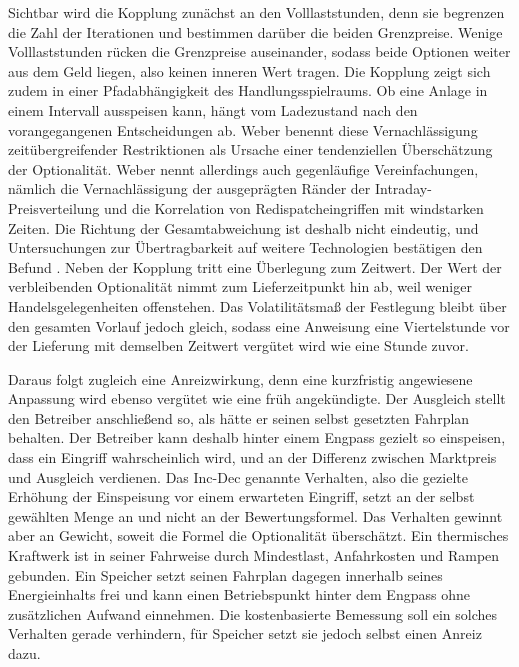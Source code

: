 Sichtbar wird die Kopplung zunächst an den Volllaststunden, denn sie begrenzen die Zahl der Iterationen und bestimmen darüber die beiden Grenzpreise.
Wenige Volllaststunden rücken die Grenzpreise auseinander, sodass beide Optionen weiter aus dem Geld liegen, also keinen inneren Wert tragen.
Die Kopplung zeigt sich zudem in einer Pfadabhängigkeit des Handlungsspielraums.
Ob eine Anlage in einem Intervall ausspeisen kann, hängt vom Ladezustand nach den vorangegangenen Entscheidungen ab.
Weber benennt diese Vernachlässigung zeitübergreifender Restriktionen als Ursache einer tendenziellen Überschätzung der Optionalität.
Weber nennt allerdings auch gegenläufige Vereinfachungen, nämlich die Vernachlässigung der ausgeprägten Ränder der Intraday-Preis\-verteilung und die Korrelation von Redispatcheingriffen mit windstarken Zeiten.
Die Richtung der Gesamtabweichung ist deshalb nicht eindeutig, und Untersuchungen zur Übertragbarkeit auf weitere Technologien bestätigen den Befund \cite{iaew_abschlussbericht_2023, iaew_folgestudie_2024}.
Neben der Kopplung tritt eine Überlegung zum Zeitwert.
Der Wert der verbleibenden Optionalität nimmt zum Lieferzeitpunkt hin ab, weil weniger Handelsgelegenheiten offenstehen.
Das Volatilitätsmaß der Festlegung bleibt über den gesamten Vorlauf jedoch gleich, sodass eine Anweisung eine Viertelstunde vor der Lieferung mit demselben Zeitwert vergütet wird wie eine Stunde zuvor.

Daraus folgt zugleich eine Anreizwirkung, denn eine kurzfristig angewiesene Anpassung wird ebenso vergütet wie eine früh angekündigte.
Der Ausgleich stellt den Betreiber anschließend so, als hätte er seinen selbst gesetzten Fahrplan behalten.
Der Betreiber kann deshalb hinter einem Engpass gezielt so einspeisen, dass ein Eingriff wahrscheinlich wird, und an der Differenz zwischen Marktpreis und Ausgleich verdienen.
Das Inc-Dec genannte Verhalten, also die gezielte Erhöhung der Einspeisung vor einem erwarteten Eingriff, setzt an der selbst gewählten Menge an und nicht an der Bewertungsformel.
Das Verhalten gewinnt aber an Gewicht, soweit die Formel die Optionalität überschätzt.
Ein thermisches Kraftwerk ist in seiner Fahrweise durch Mindestlast, Anfahrkosten und Rampen gebunden.
Ein Speicher setzt seinen Fahrplan dagegen innerhalb seines Energieinhalts frei und kann einen Betriebspunkt hinter dem Engpass ohne zusätzlichen Aufwand einnehmen.
Die kostenbasierte Bemessung soll ein solches Verhalten gerade verhindern, für Speicher setzt sie jedoch selbst einen Anreiz dazu.

